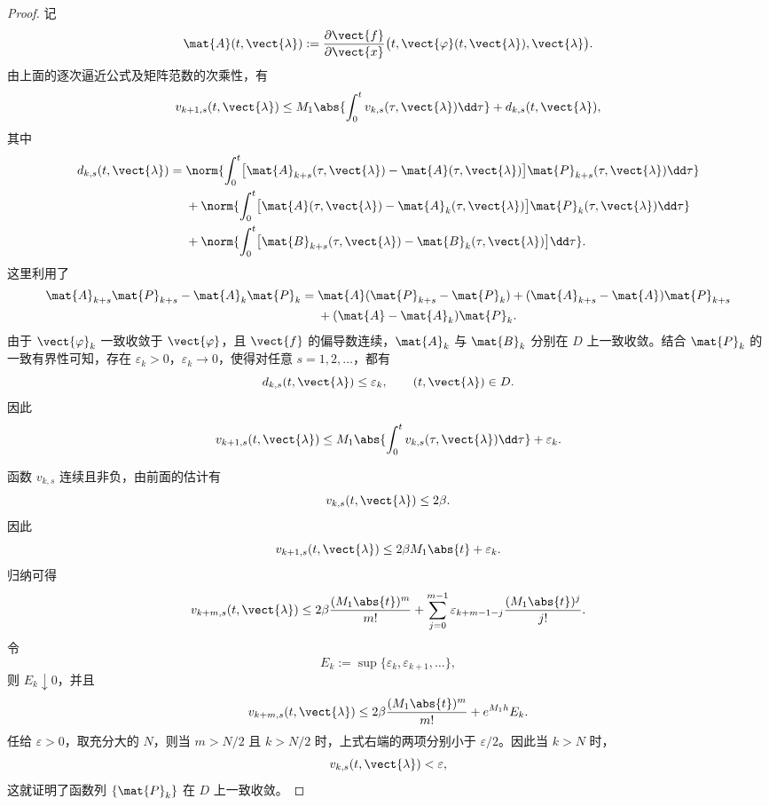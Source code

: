 \begin{proof}
	记
	\[
		\mat{A}(t,\vect{\lambda})
		\mathrel{:=}
		\dfrac{\partial\vect{f}}{\partial\vect{x}}
		\bigl(t,\vect{\varphi}(t,\vect{\lambda}),\vect{\lambda}\bigr).
	\]
	由上面的逐次逼近公式及矩阵范数的次乘性，有
	\[
		v_{k+1,s}(t,\vect{\lambda})
		\leq M_1\abs{\int_0^t
		v_{k,s}(\tau,\vect{\lambda})\dd\tau}
		+d_{k,s}(t,\vect{\lambda}),
	\]
	其中
	\[
	\begin{aligned}
		d_{k,s}(t,\vect{\lambda})
		={}&\norm{\int_0^t
		\bigl[\mat{A}_{k+s}(\tau,\vect{\lambda})
		-\mat{A}(\tau,\vect{\lambda})\bigr]
		\mat{P}_{k+s}(\tau,\vect{\lambda})\dd\tau}\\
		&+\norm{\int_0^t
		\bigl[\mat{A}(\tau,\vect{\lambda})
		-\mat{A}_k(\tau,\vect{\lambda})\bigr]
		\mat{P}_k(\tau,\vect{\lambda})\dd\tau}\\
		&+\norm{\int_0^t
		\bigl[\mat{B}_{k+s}(\tau,\vect{\lambda})
		-\mat{B}_k(\tau,\vect{\lambda})\bigr]\dd\tau}.
	\end{aligned}
	\]
	这里利用了
	\[
		\begin{aligned}
		\mat{A}_{k+s}\mat{P}_{k+s}-\mat{A}_k\mat{P}_k
		={}&\mat{A}(\mat{P}_{k+s}-\mat{P}_k)
		+(\mat{A}_{k+s}-\mat{A})\mat{P}_{k+s}\\
		&+(\mat{A}-\mat{A}_k)\mat{P}_k.
		\end{aligned}
	\]
	由于 $\vect{\varphi}_k$ 一致收敛于 $\vect{\varphi}$，且
	$\vect{f}$ 的偏导数连续，$\mat{A}_k$ 与 $\mat{B}_k$ 分别在
	$D$ 上一致收敛。结合 $\mat{P}_k$ 的一致有界性可知，存在
	$\varepsilon_k>0$，$\varepsilon_k\to0$，使得对任意
	$s=1,2,\ldots$，都有
	\[
		d_{k,s}(t,\vect{\lambda})\leq\varepsilon_k,
		\qquad (t,\vect{\lambda})\in D.
	\]
	因此
	\[
		v_{k+1,s}(t,\vect{\lambda})
		\leq M_1\abs{\int_0^t
		v_{k,s}(\tau,\vect{\lambda})\dd\tau}
		+\varepsilon_k.
	\]

	函数 $v_{k,s}$ 连续且非负，由前面的估计有
	\[
		v_{k,s}(t,\vect{\lambda})\leq2\beta.
	\]
	因此
	\[
		v_{k+1,s}(t,\vect{\lambda})
		\leq2\beta M_1\abs{t}+\varepsilon_k.
	\]
	归纳可得
	\[
		v_{k+m,s}(t,\vect{\lambda})
		\leq
		2\beta\dfrac{(M_1\abs{t})^m}{m!}
		+\sum_{j=0}^{m-1}
		\varepsilon_{k+m-1-j}
		\dfrac{(M_1\abs{t})^j}{j!}.
	\]
	令
	\[
		E_k\mathrel{:=}\sup\{\varepsilon_k,\varepsilon_{k+1},\ldots\},
	\]
	则 $E_k\downarrow0$，并且
	\[
		v_{k+m,s}(t,\vect{\lambda})
		\leq
		2\beta\dfrac{(M_1\abs{t})^m}{m!}
		+e^{M_1h}E_k.
	\]
	任给 $\varepsilon>0$，取充分大的 $N$，则当
	$m>N/2$ 且 $k>N/2$ 时，上式右端的两项分别小于
	$\varepsilon/2$。因此当 $k>N$ 时，
	\[
		v_{k,s}(t,\vect{\lambda})<\varepsilon,
	\]
	这就证明了函数列 $\{\mat{P}_k\}$ 在 $D$ 上一致收敛。


\end{proof}
